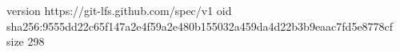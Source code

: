 version https://git-lfs.github.com/spec/v1
oid sha256:9555dd22c65f147a2e4f59a2e480b155032a459da4d22b3b9eaac7fd5e8778cf
size 298
